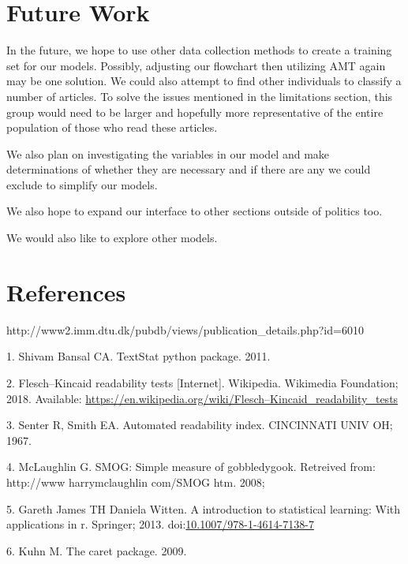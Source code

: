 \documentclass[10pt,letterpaper]{article}
\begin{document}
\section{Future Work}\label{future-work}

In the future, we hope to use other data collection methods to create a
training set for our models. Possibly, adjusting our flowchart then
utilizing AMT again may be one solution. We could also attempt to find
other individuals to classify a number of articles. To solve the issues
mentioned in the limitations section, this group would need to be larger
and hopefully more representative of the entire population of those who
read these articles.

We also plan on investigating the variables in our model and make
determinations of whether they are necessary and if there are any we
could exclude to simplify our models.

We also hope to expand our interface to other sections outside of
politics too.

We would also like to explore other models.

\section*{References}\label{references}

http://www2.imm.dtu.dk/pubdb/views/publication\_details.php?id=6010

\hypertarget{refs}{}
\hypertarget{ref-textstat}{}
1. Shivam Bansal CA. TextStat python package. 2011.

\hypertarget{ref-wikipedia_2018}{}
2. Flesch--Kincaid readability tests {[}Internet{]}. Wikipedia.
Wikimedia Foundation; 2018. Available:
\url{https://en.wikipedia.org/wiki/Flesch–Kincaid_readability_tests}

\hypertarget{ref-senter1967automated}{}
3. Senter R, Smith EA. Automated readability index. CINCINNATI UNIV OH;
1967.

\hypertarget{ref-mclaughlin2008smog}{}
4. McLaughlin G. SMOG: Simple measure of gobbledygook. Retreived from:
http://www harrymclaughlin com/SMOG htm. 2008;

\hypertarget{ref-MLbook}{}
5. Gareth James TH Daniela Witten. A introduction to statistical
learning: With applications in r. Springer; 2013.
doi:\href{https://doi.org/10.1007/978-1-4614-7138-7}{10.1007/978-1-4614-7138-7}

\hypertarget{ref-Kuhn09thecaret}{}
6. Kuhn M. The caret package. 2009.
\end{document}
